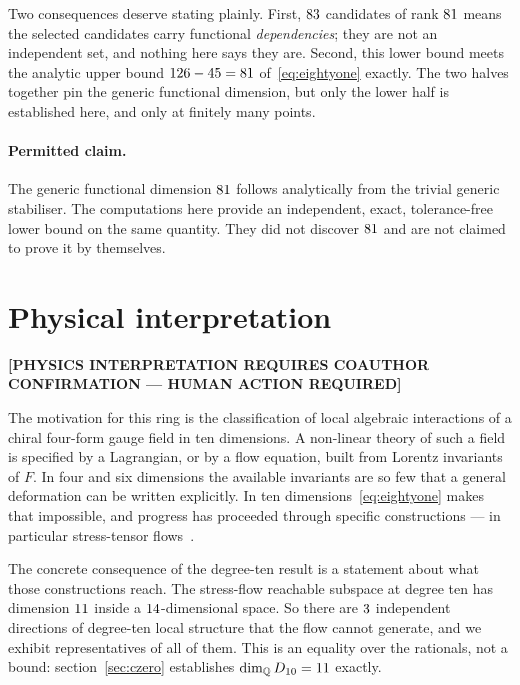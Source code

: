 \documentclass[11pt,a4paper]{article}
\newcommand{\HUMAN}[1]{\textbf{[#1 --- HUMAN ACTION REQUIRED]}}
\begin{document}
Two consequences deserve stating plainly. First, $83$ candidates of
rank $81$ means the selected candidates carry functional
\emph{dependencies}; they are not an independent set, and nothing here says they
are. Second, this lower bound meets the analytic upper bound
$126 - 45 = 81$
of~\eqref{eq:eightyone} exactly. The two halves together pin the generic
functional dimension, but only the lower half is established here, and only at
finitely many points.

\paragraph{Permitted claim.} The generic functional dimension
$81$ follows analytically from the trivial generic stabiliser.
The computations here provide an independent, exact, tolerance-free lower bound
on the same quantity. They did not discover $81$ and are not
claimed to prove it by themselves.

\section{Physical interpretation}
\label{sec:physics}

\HUMAN{PHYSICS INTERPRETATION REQUIRES COAUTHOR CONFIRMATION}

The motivation for this ring is the classification of local algebraic
interactions of a chiral four-form gauge field in ten dimensions. A non-linear
theory of such a field is specified by a Lagrangian, or by a flow equation, built
from Lorentz invariants of $F$. In four and six dimensions the available
invariants are so few that a general deformation can be written explicitly. In
ten dimensions~\eqref{eq:eightyone} makes that impossible, and progress has
proceeded through specific constructions --- in particular stress-tensor
flows~\cite{Hutomo:2025chiral}.

The concrete consequence of the degree-ten result is a statement about what those
constructions reach. The stress-flow reachable subspace at degree ten has
dimension $11$ inside a $14$-dimensional space. So there are
$3$ independent directions of degree-ten local structure that the flow
cannot generate, and we exhibit representatives of all of them. This is an
equality over the rationals, not a bound: section~\ref{sec:czero} establishes
$\dim_{\mathbb{Q}} D_{10} = 11$ exactly.
\end{document}
